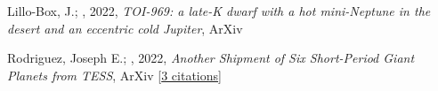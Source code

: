 \item[{\color{numcolor}\scriptsize2}] Lillo-Box, J.; \etal, 2022, \emph{TOI-969: a late-K dwarf with a hot mini-Neptune in the desert and an eccentric cold Jupiter}, ArXiv

\item[{\color{numcolor}\scriptsize1}] Rodriguez, Joseph E.; \etal, 2022, \emph{Another Shipment of Six Short-Period Giant Planets from TESS}, ArXiv [\href{https://ui.adsabs.harvard.edu/abs/2022arXiv220505709R}{3 citations}]